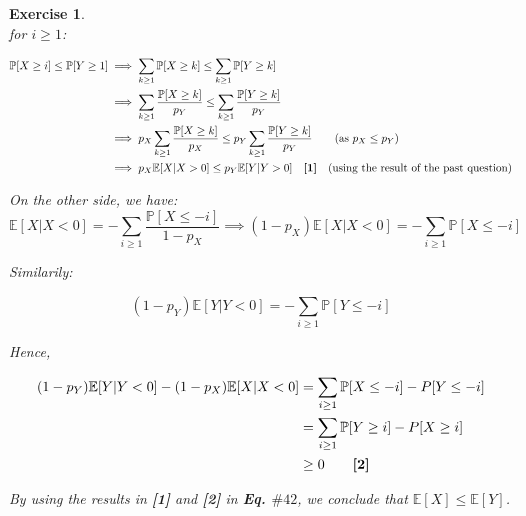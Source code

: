 \documentclass{article}
\newtheorem{exo}{Exercise}
\def\P{\mathbb{P}}
\def\E{\mathbb{E}}
\begin{document}
\begin{exo}{\ \\}
for $i \geq 1$:

\begin{align*}
    \P[X\geq i] \leq \P[Y \geq 1] 
    &\implies \sum_{k \geq 1} \P[X\geq k] \leq \sum_{k \geq 1} \P[Y \geq k]\\
    &\implies \sum_{k \geq 1} \frac{\P[X\geq k]}{p_Y}
    \leq \sum_{k \geq 1} \frac{\P[Y \geq k]}{p_Y}\\
    &\implies p_X \sum_{k \geq 1}  \frac{\P[X\geq k]}{p_X}
    \leq  p_Y \sum_{k \geq 1} \frac{\P[Y \geq k]}{p_Y} 
    \quad \quad \text{(as $p_X \leq p_Y$)}\\
    &\implies  p_X \E[X | X>0] \leq p_Y \E[Y | Y>0]
    \quad \text{\textbf{[1]}} \quad \text{(using the result of the past question)}  \\
\end{align*}

On the other side, we have:
\[
    \E[X|X<0] = -\sum_{i \geq 1} \frac{\P[X \leq -i]}{1-p_X} \implies 
    (1-p_X) \E[X|X<0] = -\sum_{i \geq 1} \P[X \leq -i]
\]

Similarily:

\[
    (1-p_Y) \E[Y|Y<0] = -\sum_{i \geq 1} \P[Y \leq -i]
\]

Hence,

\begin{align*}
     (1-p_Y) \E[Y|Y<0] -  (1-p_X) \E[X|X<0]
     &= \sum_{i \geq 1} \P[X \leq -i] - P[Y \leq -i] \\
     &= \sum_{i \geq 1} \P[Y \geq i] - P[X \geq i] \\
     &\geq 0   \quad \quad \text{\textbf{[2]} }
\end{align*}

By using the results in \textbf{[1]} and \textbf{[2]} in \textbf{Eq. $\#42$}, we conclude that $\E[X] \leq \E[Y]$.
\end{exo}
\end{document}
